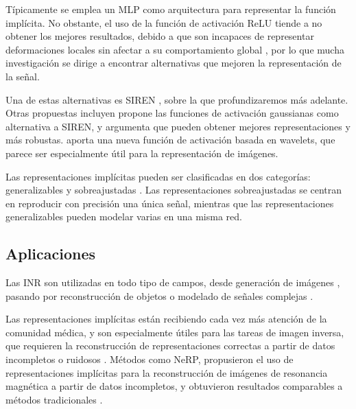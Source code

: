Típicamente se emplea un MLP como arquitectura para representar la función implícita. No obstante, el uso de la función de activación ReLU tiende a no obtener los mejores resultados, debido a que son incapaces de representar deformaciones locales sin afectar a su comportamiento global \cite{rahaman2019spectralbiasneuralnetworks},
por lo que mucha investigación se dirige a encontrar alternativas que mejoren la representación de la señal. \cite{essakine2024standimplicitneuralrepresentations}

Una de estas alternativas es SIREN \cite{sitzmann2020implicitneuralrepresentationsperiodic}, sobre la que profundizaremos más adelante.
Otras propuestas incluyen \cite{ramasinghe2022periodicityunifyingframeworkactivations} propone las funciones de activación gaussianas como alternativa a SIREN, y argumenta que pueden obtener mejores representaciones y más robustas.
\cite{saragadam2023wirewaveletimplicitneural} aporta una nueva función de activación basada en wavelets, que parece ser especialmente útil para la representación de imágenes.

Las representaciones implícitas pueden ser clasificadas en dos categorías: generalizables y sobreajustadas \cite{yu2024neuraltrajectorymodelimplicit}.
Las representaciones sobreajustadas se centran en reproducir con precisión una única señal, mientras que las representaciones generalizables pueden modelar varias en una misma red.

\subsection{Aplicaciones}
\label{subsec:Aplicacións}

Las INR son utilizadas en todo tipo de campos, desde generación de imágenes \cite{reddy2022multiimplicitneuralrepresentationfonts}, pasando por
reconstrucción de objetos \cite{mildenhall2020nerfrepresentingscenesneural} \cite{mescheder2019occupancynetworkslearning3d} o modelado de señales complejas \cite{wu2021iremhighresolutionmagneticresonance}.

Las representaciones implícitas están recibiendo cada vez más atención de la comunidad médica, y son especialmente útiles para las tareas de imagen inversa, que requieren la reconstrucción de representaciones correctas a partir de datos incompletos o ruidosos \cite{molaei2023implicitneuralrepresentationmedical}.
Métodos como NeRP, propusieron el uso de representaciones implícitas para la reconstrucción de imágenes de resonancia magnética a partir de datos incompletos, y obtuvieron resultados comparables a métodos tradicionales \cite{shen2023nerpimplicitneuralrepresentation}.

